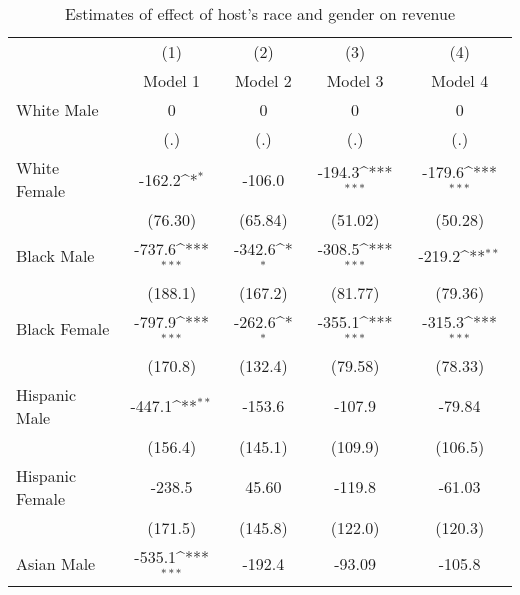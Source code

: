 {
\def\sym#1{\ifmmode^{#1}\else\(^{#1}\)\fi}
\begin{longtable}{l*{4}{c}}
\caption{Estimates of effect of host's race and gender on revenue}\\
\hline\hline\endfirsthead\hline\endhead\hline\endfoot\endlastfoot
                    &\multicolumn{1}{c}{(1)}&\multicolumn{1}{c}{(2)}&\multicolumn{1}{c}{(3)}&\multicolumn{1}{c}{(4)}\\
                    &\multicolumn{1}{c}{Model 1}&\multicolumn{1}{c}{Model 2}&\multicolumn{1}{c}{Model 3}&\multicolumn{1}{c}{Model 4}\\
\hline
White Male          &           0         &           0         &           0         &           0         \\
                    &         (.)         &         (.)         &         (.)         &         (.)         \\
[1em]
White Female        &      -162.2\sym{*}  &      -106.0         &      -194.3\sym{***}&      -179.6\sym{***}\\
                    &     (76.30)         &     (65.84)         &     (51.02)         &     (50.28)         \\
[1em]
Black Male          &      -737.6\sym{***}&      -342.6\sym{*}  &      -308.5\sym{***}&      -219.2\sym{**} \\
                    &     (188.1)         &     (167.2)         &     (81.77)         &     (79.36)         \\
[1em]
Black Female        &      -797.9\sym{***}&      -262.6\sym{*}  &      -355.1\sym{***}&      -315.3\sym{***}\\
                    &     (170.8)         &     (132.4)         &     (79.58)         &     (78.33)         \\
[1em]
Hispanic Male       &      -447.1\sym{**} &      -153.6         &      -107.9         &      -79.84         \\
                    &     (156.4)         &     (145.1)         &     (109.9)         &     (106.5)         \\
[1em]
Hispanic Female     &      -238.5         &       45.60         &      -119.8         &      -61.03         \\
                    &     (171.5)         &     (145.8)         &     (122.0)         &     (120.3)         \\
[1em]
Asian Male          &      -535.1\sym{***}&      -192.4         &      -93.09         &      -105.8         \\

\end{longtable}}
